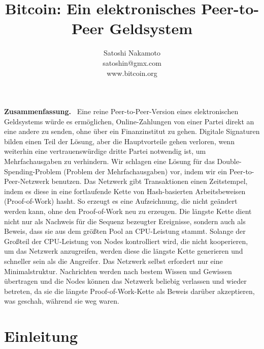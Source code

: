 \documentclass[9pt]{article}
\title{\huge{\textbf{Bitcoin: Ein elektronisches Peer-to-Peer Geldsystem}}}
\author{\normalsize Satoshi Nakamoto\\ \normalsize satoshin@gmx.com\\ \normalsize www.bitcoin.org}
\date{}
\makeatletter
\renewenvironment{abstract}{%
  \if@twocolumn
    \section*{\abstractname}
  \else
    \small
    \vspace*{-9mm}
    \begin{center}
    \end{center} 
    \quotation
  \fi
}
{
  \if@twocolumn
  \else
    \endquotation
  \fi
}
\makeatother
\begin{document}
	\maketitle
	
	\begin{abstract}
		\noindent \textbf{Zusammenfassung.} \ Eine reine Peer-to-Peer-Version eines elektronischen Geldsystems würde es ermöglichen, Online-Zahlungen von einer Partei direkt an eine andere zu senden, ohne über ein Finanzinstitut zu gehen. Digitale Signaturen bilden einen Teil der Lösung, aber die Hauptvorteile gehen verloren, wenn weiterhin eine vertrauenswürdige dritte Partei notwendig ist, um Mehrfachausgaben zu verhindern. Wir schlagen eine Lösung für das Double-Spending-Problem (Problem der Mehrfachausgaben) vor, indem wir ein Peer-to-Peer-Netzwerk benutzen. Das Netzwerk gibt Transaktionen einen Zeitstempel, indem es diese in eine fortlaufende Kette von Hash-basierten Arbeitsbeweisen (Proof-of-Work) hasht. So erzeugt es eine Aufzeichnung, die nicht geändert werden kann, ohne den Proof-of-Work neu zu erzeugen. Die längste Kette dient nicht nur als Nachweis für die Sequenz bezeugter Ereignisse, sondern auch als Beweis, dass sie aus dem größten Pool an CPU-Leistung stammt. Solange der Großteil der CPU-Leistung von Nodes kontrolliert wird, die nicht kooperieren, um das Netzwerk anzugreifen, werden diese die längste Kette generieren und schneller sein als die Angreifer. Das Netzwerk selbst erfordert nur eine Minimalstruktur. Nachrichten werden nach bestem Wissen und Gewissen übertragen und die Nodes können das Netzwerk beliebig verlassen und wieder betreten, da sie die längste Proof-of-Work-Kette als Beweis darüber akzeptieren, was geschah, während sie weg waren.
	\end{abstract}
	
	\section{Einleitung}
	
\end{document}
